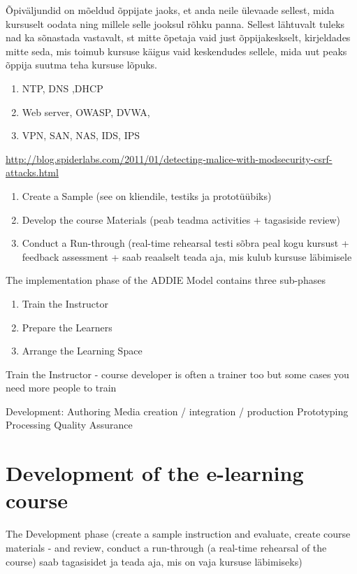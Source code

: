 Õpiväljundid on mõeldud õppijate jaoks, et anda neile ülevaade sellest, mida kursuselt oodata ning
millele selle jooksul rõhku panna. Sellest lähtuvalt tuleks nad ka sõnastada vastavalt, st mitte õpetaja
vaid just õppijakeskselt, kirjeldades mitte seda, mis toimub kursuse käigus vaid keskendudes sellele,
mida uut peaks õppija suutma teha kursuse lõpuks.

\begin{enumerate}[label=Learning Objective \arabic*.,leftmargin=*]
\item NTP, DNS ,DHCP
\item Web server, OWASP, DVWA,
\item VPN, SAN, NAS, IDS, IPS
\end{enumerate}

\url{http://blog.spiderlabs.com/2011/01/detecting-malice-with-modsecurity-csrf-attacks.html}



\begin{enumerate}
\item Create a Sample (see on kliendile, testiks ja prototüübiks)
\item Develop the course Materials (peab teadma activities + tagasiside review)
\item Conduct a Run-through (real-time rehearsal testi sõbra peal kogu kursust +  feedback assessment + saab reaalselt teada aja, mis kulub kursuse läbimisele
\end{enumerate}


The implementation phase of the ADDIE Model contains three sub-phases

\begin{enumerate}
\item Train the Instructor
\item Prepare the Learners
\item Arrange the Learning Space
\end{enumerate}

Train the Instructor - course developer is often a trainer too but some cases you need more people to train


Development:
Authoring
Media creation / integration / production
Prototyping
Processing
Quality Assurance

\section{Development of the e-learning course}
The Development phase  (create a sample instruction and evaluate, create course materials - and review, conduct a run-through (a real-time rehearsal of the course) saab tagasisidet ja teada aja, mis on vaja kursuse läbimiseks)


